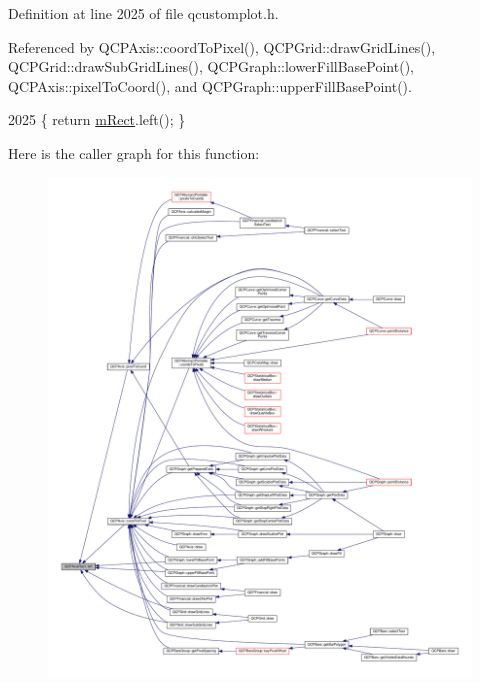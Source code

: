 Definition at line 2025 of file qcustomplot.\+h.



Referenced by Q\+C\+P\+Axis\+::coord\+To\+Pixel(), Q\+C\+P\+Grid\+::draw\+Grid\+Lines(), Q\+C\+P\+Grid\+::draw\+Sub\+Grid\+Lines(), Q\+C\+P\+Graph\+::lower\+Fill\+Base\+Point(), Q\+C\+P\+Axis\+::pixel\+To\+Coord(), and Q\+C\+P\+Graph\+::upper\+Fill\+Base\+Point().


\begin{DoxyCode}
2025 \{ \textcolor{keywordflow}{return} \hyperlink{class_q_c_p_layout_element_ad8896f05550389f7b9e92c9e6cdf6e01}{mRect}.left(); \}
\end{DoxyCode}


Here is the caller graph for this function\+:\nopagebreak
\begin{figure}[H]
\begin{center}
\leavevmode
\includegraphics[width=350pt]{class_q_c_p_axis_rect_a55b3ecf72a3a65b053f7651b88db458d_icgraph}
\end{center}
\end{figure}


\hypertarget{class_q_c_p_axis_rect_a4baf3d5dd69166788f6ceda0ea182c6e}{}

